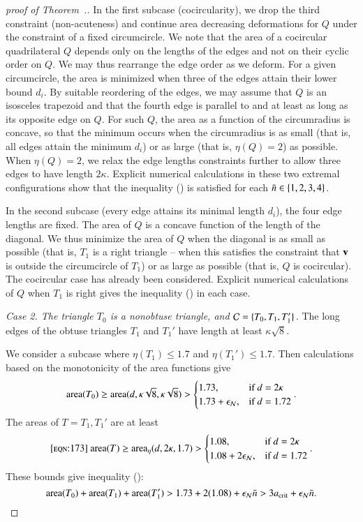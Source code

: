 \begin{proof}[proof of Theorem~.]
In the first subcase (cocircularity), we drop the third constraint
(non-acuteness) and continue area decreasing deformations for $Q$
under the constraint of a fixed circumcircle.  We note that the area
of a cocircular quadrilateral $Q$ depends only on the lengths of the
edges and not on their cyclic order on $Q$.  We may thus rearrange the
edge order as we deform.  For a given circumcircle, the area is
minimized when three of the edges attain their lower bound $d_i$.  By
suitable reordering of the edges, we may assume that $Q$ is an
isosceles trapezoid and that the fourth edge is parallel to and
at least as long as its opposite edge on $Q$.  For such $Q$, the area as a
function of the circumradius is concave, so that the minimum occurs
when the circumradius is as small (that is, all edges attain the
minimum $d_i$) or as large (that is, $\eta(Q)=2$) as possible.  When
$\eta(Q)=2$, we relax the edge lengths constraints further to allow
three edges to have length $2\kappa$.  Explicit numerical calculations
in these two extremal configurations show that the inequality
() is satisfied for each $\bar n\in \{1,2,3,4\}$.

In the second subcase (every edge attains its minimal length $d_i$),
the four edge lengths are fixed.  The area of $Q$ is a concave
function of the length of the diagonal.  We thus minimize the area of
$Q$ when the diagonal is as small as possible (that is, $T_1$ is a
right triangle -- when this satisfies the constraint that ${\mathbf v}$ is
outside the circumcircle of $T_1$) or as large as possible (that is,
$Q$ is cocircular).  The cocircular case has already been considered.
Explicit numerical calculations of $Q$ when $T_1$ is right gives the
inequality () in each case.


{\it Case 2. The triangle $T_0$ is a nonobtuse triangle, and
  $\mathcal C=\{T_0,T_1,T_1'\}$.}  
The long edges of the obtuse triangles
$T_1$ and $T_1'$ have length at least $\kappa\sqrt{8}$.

We consider a subcase where $\eta(T_1)\le 1.7$ and $\eta(T_1') \le
1.7$.  Then calculations based on the monotonicity of the area
functions give
\[
{\operatorname{area}}(T_0) \ge {\operatorname{area}}(d,\kappa\sqrt{8},\kappa\sqrt{8}) > 
   \begin{cases}1.73,&\text{if } d= 2\kappa\\ 
     1.73+\epsilon_{\mathcal N}, & \text{if } d = 1.72 \end{cases}.
\]
The areas of $T=T_1,T_1'$ are at least
\begin{equation}\libel{eqn:173}
\area(T) \ge \areta(d,2\kappa,1.7) >
   \begin{cases}1.08,&\text{if } d = 2\kappa\\
     1.08+2\epsN, & \text{if } d = 1.72 \end{cases}.
\end{equation}
These bounds give inequality ():
\[
{\operatorname{area}}(T_0) +{\operatorname{area}}(T_1) + {\operatorname{area}}(T_1')  > 1.73 + 2(1.08) + \epsilon_{\mathcal N} \bar n > 
3 a_\text{crit} +  \epsilon_{\mathcal N} \bar n.
\]


\end{proof}
